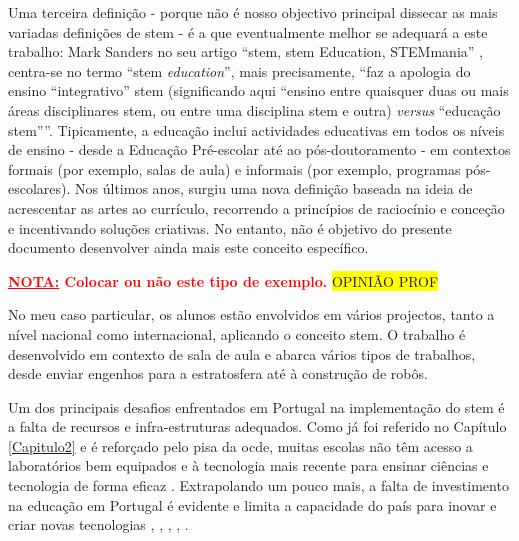 Uma terceira definição - porque não é nosso objectivo principal dissecar as mais variadas definições de \acrshort{stem} - é a que eventualmente melhor se adequará a este trabalho: Mark Sanders no seu artigo ``\acrshort{stem}, \acrshort{stem} Education, STEMmania'' \cite{TTTSTEMA77:online}, centra-se no termo ``\acrshort{stem} \textit{education}'', mais precisamente, ``faz a apologia do ensino ``integrativo'' \acrshort{stem} (significando aqui ``ensino entre quaisquer duas ou mais áreas disciplinares  \acrshort{stem}, ou entre uma disciplina \acrshort{stem} e outra) \textit{versus} ``educação \acrshort{stem}''''.
Tipicamente, a educação inclui actividades educativas em todos os níveis de ensino - desde a Educação Pré-escolar até ao pós-doutoramento - em contextos formais (por exemplo, salas de aula) e informais (por exemplo, programas pós-escolares). Nos últimos anos, surgiu uma nova definição baseada na ideia de acrescentar as artes ao currículo, recorrendo a princípios de raciocínio e conceção e incentivando soluções criativas. No entanto, não é objetivo do presente documento desenvolver ainda mais este conceito específico.

\textcolor{red}{\textbf{\underline{NOTA:} Colocar ou não este tipo de exemplo.}}
\colorbox{yellow}{OPINIÃO PROF}

No meu caso particular, os alunos estão envolvidos em vários projectos, tanto a nível nacional como internacional, aplicando o conceito \acrshort{stem}. O trabalho é desenvolvido em contexto de sala de aula e abarca vários tipos de trabalhos, desde enviar engenhos para a estratosfera até à construção de robôs.



Um dos principais desafios enfrentados em Portugal na implementação do \acrshort{stem} é a falta de recursos e infra-estruturas adequados. Como já foi referido no Capítulo \ref{Capitulo2} e é reforçado pelo \acrfull{pisa} da \acrfull{ocde}, muitas escolas não têm acesso a laboratórios bem equipados e à tecnologia mais recente para ensinar ciências e tecnologia de forma eficaz \cite{pisa2018}. Extrapolando um pouco mais, a falta de investimento na educação em Portugal é evidente e limita a capacidade do país para inovar e criar novas tecnologias \cite{Oquefalt37:online}, \cite{Faltadei99:online}, \cite{Odesinve56:online}, \cite{EDUSTATP20:online}, \cite{Portugal69:online}.


